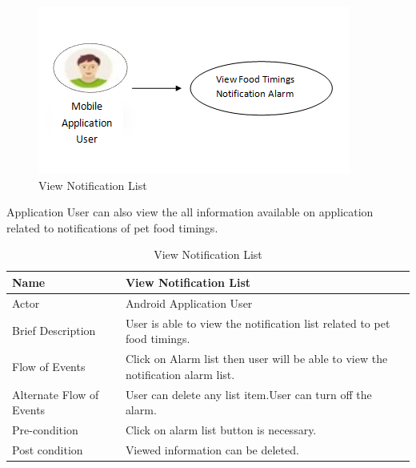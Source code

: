 \newpage
\begin{figure}[H]
  \centering
    \includegraphics{37UseCase}
    \caption{View Notification List}
\end{figure}
Application User can also view the all information available on application related to notifications of pet food timings.
\begin{table}[ht]
\centering

\label{View Notification List}
\begin{tabular}{|l|l|}
\hline
Name                     & View Notification List                                                          \\ \hline
Actor                    & Android Application User                                                        \\ \hline
Brief Description        & User is able to view the notification list related to pet food timings.         \\ \hline
Flow of Events           & Click on Alarm list then user will be able to view the notification alarm list. \\ \hline
Alternate Flow of Events & User can delete any list item.User can turn off the alarm.                      \\ \hline
Pre-condition            & Click on alarm list button is necessary.                                        \\ \hline
Post condition           & Viewed information can be deleted.                                              \\ \hline
\end{tabular}
\caption{View Notification List}
\end{table}


